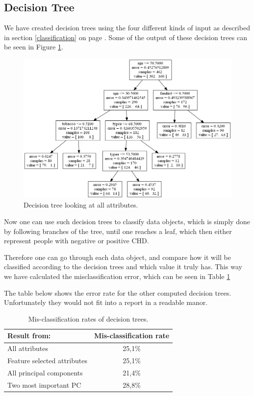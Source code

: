 \subsection{Decision Tree}

We have created decision trees using the four different kinds of input as described in section \ref{classification} on page \pageref{classification}. Some of the output of these decision trees can be seen in Figure \ref{decisionTreeX}.

\begin{figure}[H]
\center
	\includegraphics[scale=0.25]{pictures/Decision_Tree_X.png}
	\caption{Decision tree looking at all attributes.}
	\label{decisionTreeX}
\end{figure}

Now one can use such decision trees to classify data objects, which is simply done by following branches of the tree, until one reaches a leaf, which then either represent people with negative or positive CHD.

Therefore one can go through each data object, and compare how it will be classified according to the decision trees and which value it truly has. This way we have calculated the misclassification error, which can be seen in Table \ref{decisionTreeErrorRate}

The table below shows the error rate for the other computed decision trees. Unfortunately they would not fit into a report in a readable manor.
\begin{table}[H]
\begin{longtable}{lc}\hline
Result from: & Mis-classification rate \\ \hline
All attributes & 25,1\% \\ 
Feature selected attributes & 25,1\% \\ 
All principal components & 21,4\% \\ 
Two most important PC & 28,8\% \\ \hline
\end{longtable}
\caption{Mis-classification rates of decision trees.}
\label{decisionTreeErrorRate}
\end{table}


